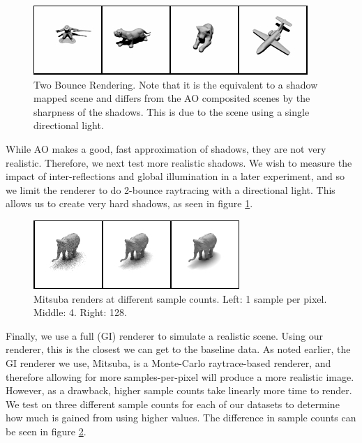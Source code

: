 \documentclass[10pt,twocolumn,letterpaper]{article}
\begin{document}
\begin{figure}[h!]
\centering
\includegraphics[width=1.0\columnwidth]{./assets/2bounce_small.png}
\caption{Two Bounce Rendering.  Note that it is the equivalent to a shadow mapped scene and differs from the AO composited scenes by the sharpness of the shadows. This is due to the scene using a single directional light.}
\label{fig:2BOUNCE}
\end{figure}
While AO makes a good, fast approximation of shadows, they are not very realistic. Therefore, we next test more realistic shadows. We wish to measure the impact of inter-reflections and global illumination in a later experiment, and so we limit the renderer to do 2-bounce raytracing with a directional light. This allows us to create very hard shadows, as seen in figure \ref{fig:2BOUNCE}.

\begin{figure}[h!]
\centering
\includegraphics[width=1.0\columnwidth]{./assets/mitsuba-onerow.png}
\caption{
Mitsuba renders at different sample counts. Left: 1 sample per pixel.  Middle: 4.  Right: 128.}
\label{fig:differentsamplesraw}
\end{figure}
Finally, we use a full (GI) renderer to simulate a realistic scene. Using our renderer, this is the closest we can get to the baseline data. As noted earlier, the GI renderer we use, Mitsuba, is a Monte-Carlo raytrace-based renderer, and therefore allowing for more samples-per-pixel will produce a more realistic image. However, as a drawback, higher sample counts take linearly more time to render. 
We test on three different sample counts for each of our datasets to determine how much is gained from using higher values. The difference in sample counts can be seen in figure \ref{fig:differentsamplesraw}.
\end{document}
